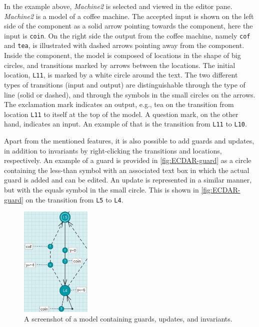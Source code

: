In the example above, \textit{Machine2} is selected and viewed in the editor pane. \textit{Machine2} is a model of a coffee machine. The accepted input is shown on the left side of the component as a solid arrow pointing towards the component, here the input is \texttt{coin}. On the right side the output from the coffee machine, namely \texttt{cof} and \texttt{tea}, is illustrated with dashed arrows pointing away from the component. 
Inside the component, the model is composed of locations in the shape of big circles, and transitions marked by arrows between the locations. The initial location, \texttt{L11}, is marked by a white circle around the text.
The two different types of transitions (input and output) are distinguishable through the type of line (solid or dashed), and through the symbols in the small circles on the arrows. The exclamation mark indicates an output, e.g., tea on the transition from location \texttt{L11} to itself at the top of the model. A question mark, on the other hand, indicates an input. An example of that is the transition from \texttt{L11} to \texttt{L10}.

Apart from the mentioned features, it is also possible to add guards and updates, in addition to invariants by right-clicking the transitions and locations, respectively. An example of a guard is provided in \autoref{fig:ECDAR-guard} as a circle containing the less-than symbol with an associated text box in which the actual guard is added and can be edited. 
An update is represented in a similar manner, but with the equals symbol in the small circle. This is shown in \autoref{fig:ECDAR-guard} on the transition from \texttt{L5} to \texttt{L4}.

\begin{figure}[H]
    \centering
    \includegraphics[width=0.3\textwidth]{common/figures/ecdar-guards.jpg}
    \caption{A screenshot of a model containing guards, updates, and invariants.}
    \label{fig:ECDAR-guard}
\end{figure}

